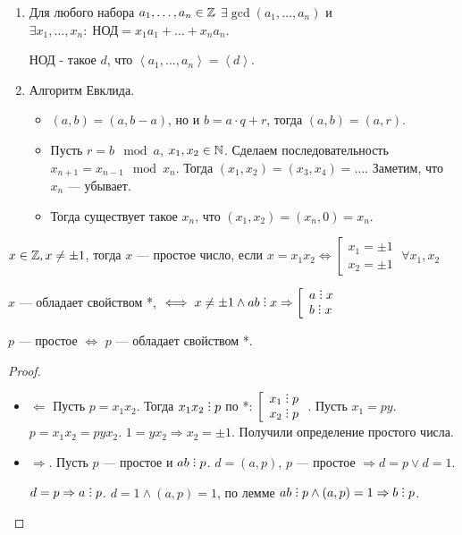 \begin{enumerate}
    \item Для любого набора $a_1, \ldots, a_n \in \mathbb{Z}$ $\exists \gcd(a_1,\ldots,a_n)$ и $\exists x_1,\ldots,x_n: \; \text{НОД} = x_1a_1 + \ldots + x_n a_n$. 

        НОД - такое $d$, что  $\left< a_1,\ldots,a_n \right> = \left<d\right>$.
    \item Алгоритм Евклида. 
        \begin{itemize}
            \item $(a, b) = (a, b - a)$, но и  $b = a \cdot q + r$, тогда  $(a, b) = (a, r)$.
            
            \item Пусть $r = b \mod a$,  $x_1,x_2 \in \mathbb{N}$. Сделаем последовательность $x_{n+1} = x_{n - 1} \mod x_{n}$. Тогда  $(x_1, x_2) = (x_3, x_4) = \ldots$. Заметим, что $x_n$ --- убывает.

            \item Тогда существует такое  $x_n$, что  $(x_1, x_2) = (x_n, 0) = x_n$.
        \end{itemize}
\end{enumerate}
\begin{definition}
    $x \in \mathbb{Z}, x \neq \pm 1$, тогда  $x$ --- простое число, если $x = x_1x_2 \iff \left[ \begin{array}{l} x_1 = \pm 1 \\ x_2 = \pm 1 \end{array} \right. \; \forall x_1, x_2$
\end{definition}
\begin{property}[*]
    $x$ --- обладает свойством  *, $\iff x \neq \pm 1 \land ab \divby x \Rightarrow \left[ \begin{array}{l} a \divby x \\ b \divby x \end{array} \right.$ 
\end{property}
\begin{statement}
    $p$ --- простое  $\iff$ $p$ --- обладает свойством *. \\
\end{statement}
\begin{proof}
    \slashn
     \begin{itemize}
         \item $\Leftarrow$ Пусть $p = x_1x_2$. Тогда $x_1x_2 \divby p$ по *: $\left[ \begin{array}{l} x_1 \divby p \\ x_2 \divby p \end{array} \right.$. Пусть $x_1 = py$. $p = x_1x_2 = pyx_2$. $1 = yx_2 \Rightarrow x_2 = \pm 1$. Получили определение простого числа.
             \item $\Rightarrow$. Пусть  $p$ --- простое и  $ab \divby p$.  $d = (a, p)$, $p$ --- простое  $\Rightarrow d = p \lor d = 1$.

                 $d = p \Rightarrow a \divby p$. $d = 1 \land (a, p) = 1$, по лемме  $ab \divby p \land (a,p) = 1 \Rightarrow b \divby p$.
     \end{itemize}
\end{proof}
